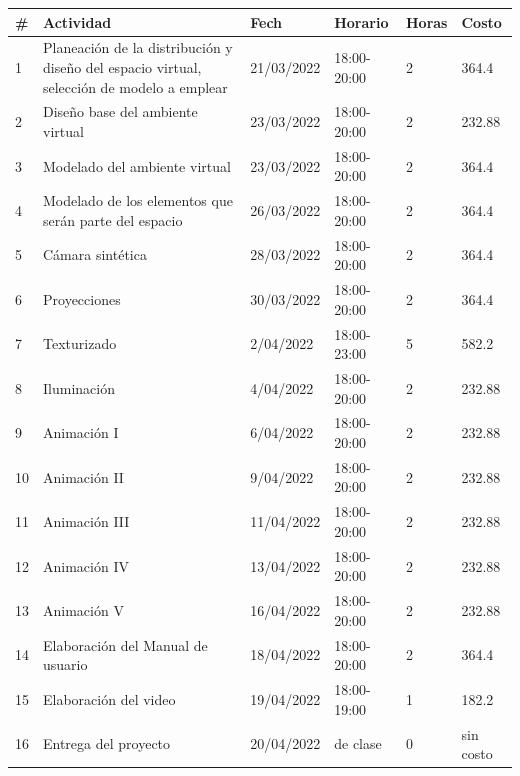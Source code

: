 \documentclass[12pt]{article} %
\begin{document}
 	\begin{center}
 		\def\arraystretch{1.5} %
		\begin{tabular}{ | m{1.5em} | m{12em} | m{5.5em} | m{5.5em} | m{3em} | m{5.5em} |}
			\hline
			\rowcolor[rgb]{0.6,0.8,1.0}
			\textbf{\#} & \textbf{Actividad} & \textbf{Fech}& \textbf{Horario} & \textbf{Horas} & \textbf{Costo} \\ 
			\hline
			\hline
			\rowcolor[rgb]{0.8,0.6,1.0}
			1 & Planeación de la distribución y diseño del espacio virtual, selección de modelo a emplear & 21/03/2022 & 18:00-20:00 & 2 & 364.4 \\ 
			\hline
			\rowcolor[rgb]{0.6,0.8,1.0}
			2 & Diseño base del ambiente virtual & 23/03/2022 & 18:00-20:00 & 2 & 232.88 \\ 
			\hline
			\rowcolor[rgb]{0.8,0.6,1.0}
			3 & Modelado del ambiente virtual & 23/03/2022 & 18:00-20:00 & 2 & 364.4 \\ 
			\hline
			\rowcolor[rgb]{0.6,0.8,1.0}
			4 & Modelado de los elementos que serán parte del espacio & 26/03/2022 & 18:00-20:00 & 2 & 364.4 \\ 
			\hline
			\rowcolor[rgb]{0.8,0.6,1.0}
			5 & Cámara sintética & 28/03/2022 & 18:00-20:00 & 2 & 364.4\\ 
			\hline
			\rowcolor[rgb]{0.6,0.8,1.0}
			6 & Proyecciones &  30/03/2022 & 18:00-20:00 & 2 & 364.4 \\ 
			\hline
			\rowcolor[rgb]{0.8,0.6,1.0}
			7 & Texturizado & 2/04/2022 & 18:00-23:00 & 5 & 582.2 \\ 
			\hline
			\rowcolor[rgb]{0.6,0.8,1.0}
			8 & Iluminación & 4/04/2022 & 18:00-20:00 & 2 & 232.88 \\ 
			\hline
			\rowcolor[rgb]{0.8,0.6,1.0}
			9 & Animación I & 6/04/2022 & 18:00-20:00 & 2 & 232.88 \\ 
			\hline
			\rowcolor[rgb]{0.6,0.8,1.0}
			10 & Animación II  & 9/04/2022 & 18:00-20:00 & 2 & 232.88 \\ 
			\hline
			\rowcolor[rgb]{0.8,0.6,1.0}
			11 & Animación III & 11/04/2022 & 18:00-20:00 & 2 & 232.88 \\ 
			\hline
			\rowcolor[rgb]{0.6,0.8,1.0}
			12 & Animación IV & 13/04/2022 & 18:00-20:00 & 2 & 232.88 \\ 
			\hline
			\rowcolor[rgb]{0.8,0.6,1.0}
			13 & Animación V & 16/04/2022 & 18:00-20:00 & 2 & 232.88 \\ 
			\hline
			\rowcolor[rgb]{0.6,0.8,1.0}
			14 & Elaboración del Manual de usuario & 18/04/2022 & 18:00-20:00 & 2 & 364.4 \\ 
			\hline
			\rowcolor[rgb]{0.8,0.6,1.0}
			15 & Elaboración del video  & 19/04/2022 & 18:00-19:00 & 1 & 182.2 \\ 
			\hline
			\rowcolor[rgb]{0.6,0.8,1.0}
			16 & Entrega del proyecto & 20/04/2022 & de clase & 0 & sin costo \\ 
			\hline
		\end{tabular}
	\end{center}
	
\end{document}
